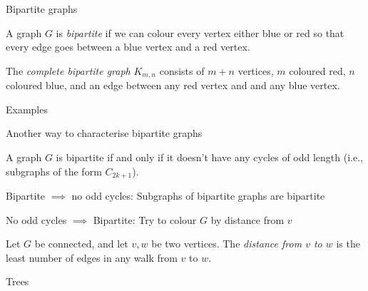 \documentclass{beamer}
\begin{document}
\begin{frame}{Bipartite graphs}
  \begin{definition} A graph $G$ is \emph{bipartite} if we can colour every vertex either blue or red so that every edge goes between a blue vertex and a red vertex.
  \end{definition}
  \begin{definition} The \emph{complete bipartite graph} $K_{m,n}$ consists of $m+n$ vertices, $m$ coloured red, $n$ coloured blue, and an edge between any red vertex and and any blue vertex.
  \end{definition}

  \begin{block}{Examples}
    \end{block}
\end{frame}

\begin{frame}{Another way to characterise bipartite graphs}  
  \begin{lemma}A graph $G$ is bipartite if and only if it doesn't have any cycles of odd length (i.e., subgraphs of the form $C_{2k+1}$).
    
    \end{lemma}
  \begin{block}{Bipartite $\implies$ no odd cycles:}
    Subgraphs of bipartite graphs are bipartite
  \end{block}
  \begin{block}{No odd cycles $\implies$ Bipartite:}
Try to colour $G$ by distance from $v$   
\end{block}
  \begin{definition}[Distance]Let $G$ be connected, and let $v,w$ be two vertices.  The \emph{distance from $v$ to $w$} is the least number of edges in any walk from $v$ to $w$.
    \end{definition}


  
\end{frame}

\begin{frame}[plain,c]

\begin{center}

\Huge

Trees
\end{center}

\end{frame}
\end{document}
